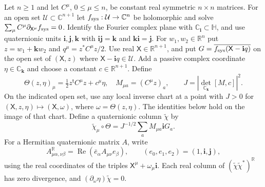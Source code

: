 Let $n\ge1$ and let $C^\mu$, $0\le\mu\le n$, be constant real symmetric $n\times n$ matrices. For an open set $\mathcal U\subset\mathbb C^{n+1}$ let $f_{\rm sys}:\mathcal U\to\mathbb C^n$ be holomorphic and solve $\sum_\mu C^\mu\partial_{\mathsf X^\mu}f_{\rm sys}=0$. Identify the Fourier complex plane with $\mathbb C_{\mathbf i}\subset\mathbb H$, and use quaternionic units $\mathbf i,\mathbf j,\mathbf k$ with $\mathbf{ij}=\mathbf k$ and $\mathbf{ki}=\mathbf j$. For $w_1,w_2\in\mathbb R^n$ put $z=w_1+\mathbf k w_2$ and $q^\mu=z^*C^\mu z/2$. Use real $\mathsf X\in\mathbb R^{n+1}$, and put $G=\overline{f_{\rm sys}(\mathsf X-\mathbf i q)}$ on the open set of $(\mathsf X,z)$ where $\mathsf X-\mathbf i q\in\mathcal U$. Add a passive complex coordinate $\eta\in\mathbb C_{\mathbf k}$ and choose a constant $c\in\mathbb R^{n+1}$. Define
\[
\Theta(z,\eta)_\mu=\tfrac12z^{\mathsf t}C^\mu z+c^\mu\eta,\quad
M_{\mu a}=(C^\mu z)_a,\qquad J=|\det_{\mathbb C_{\mathbf k}}[M,c]|^2.
\]
On the indicated open set, use any local inverse chart at a point with $J>0$ for $(\mathsf X,z,\eta)\mapsto(\mathsf X,\omega)$, where $\omega=\Theta(z,\eta)$. The identities below hold on the image of that chart. Define a quaternionic column $\widetilde\chi$ by
\[
\widetilde\chi_\mu\circ\Theta=J^{-1/2}\sum_aM_{\mu a}\mathbf i G_a.
\]
For a Hermitian quaternionic matrix $A$, write
\[
A^{\mathbb R}_{\mu\alpha,\nu\beta}=\operatorname{Re}(\bar e_\alpha A_{\mu\nu}e_\beta),
\qquad(e_0,e_1,e_2)=(1,\mathbf i,\mathbf j),
\]
using the real coordinates of the triples $\mathsf X^\mu+\omega_\mu\mathbf i$. Each real column of $(\widetilde\chi\widetilde\chi^*)^{\mathbb R}$ has zero divergence, and $(\partial_\omega\eta)\widetilde\chi=0$.
